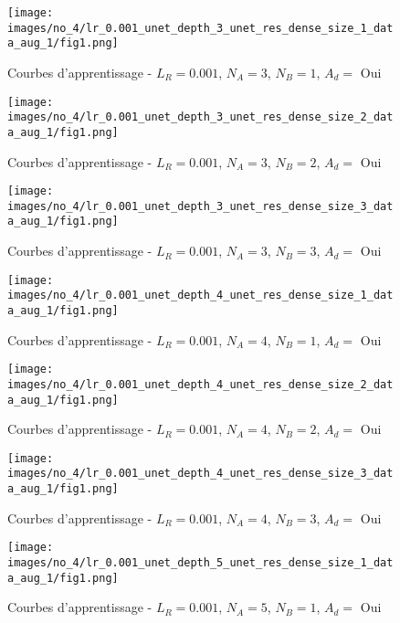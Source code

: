     
    \begin{figure}[H]
        \centering 
        \texttt{[image: images/no\_4/lr\_0.001\_unet\_depth\_3\_unet\_res\_dense\_size\_1\_data\_aug\_1/fig1.png]}
        \caption{Courbes d’apprentissage - \(L_R=0.001\), \(N_A=3\), \(N_B=1\), \(A_d= \) Oui}
    \end{figure}
    
    \begin{figure}[H]
        \centering 
        \texttt{[image: images/no\_4/lr\_0.001\_unet\_depth\_3\_unet\_res\_dense\_size\_2\_data\_aug\_1/fig1.png]}
        \caption{Courbes d’apprentissage - \(L_R=0.001\), \(N_A=3\), \(N_B=2\), \(A_d= \) Oui}
    \end{figure}

    \begin{figure}[H]
        \centering 
        \texttt{[image: images/no\_4/lr\_0.001\_unet\_depth\_3\_unet\_res\_dense\_size\_3\_data\_aug\_1/fig1.png]}
        \caption{Courbes d’apprentissage - \(L_R=0.001\), \(N_A=3\), \(N_B=3\), \(A_d= \) Oui}
    \end{figure}

    \begin{figure}[H]
        \centering 
        \texttt{[image: images/no\_4/lr\_0.001\_unet\_depth\_4\_unet\_res\_dense\_size\_1\_data\_aug\_1/fig1.png]}
        \caption{Courbes d’apprentissage - \(L_R=0.001\), \(N_A=4\), \(N_B=1\), \(A_d= \) Oui}
    \end{figure}
    
    \begin{figure}[H]
        \centering 
        \texttt{[image: images/no\_4/lr\_0.001\_unet\_depth\_4\_unet\_res\_dense\_size\_2\_data\_aug\_1/fig1.png]}
        \caption{Courbes d’apprentissage - \(L_R=0.001\), \(N_A=4\), \(N_B=2\), \(A_d= \) Oui}
    \end{figure}
    
    \begin{figure}[H]
        \centering 
        \texttt{[image: images/no\_4/lr\_0.001\_unet\_depth\_4\_unet\_res\_dense\_size\_3\_data\_aug\_1/fig1.png]}
        \caption{Courbes d’apprentissage - \(L_R=0.001\), \(N_A=4\), \(N_B=3\), \(A_d= \) Oui}
    \end{figure}

    \begin{figure}[H]
        \centering 
        \texttt{[image: images/no\_4/lr\_0.001\_unet\_depth\_5\_unet\_res\_dense\_size\_1\_data\_aug\_1/fig1.png]}
        \caption{Courbes d’apprentissage - \(L_R=0.001\), \(N_A=5\), \(N_B=1\), \(A_d= \) Oui}
    \end{figure}
    
